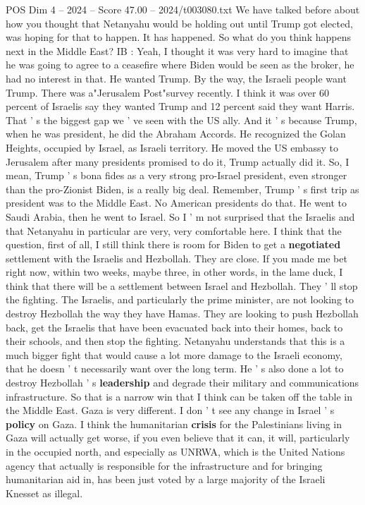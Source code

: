 \begin{textsample}{POS Dim 4 – 2024 – Score 47.00 – 2024/t003080.txt}
We have talked before about how you thought that Netanyahu would be holding out until Trump got elected, was hoping for that to happen.
It has happened.
So what do you think happens next in the Middle East?
IB : Yeah, I thought it was very hard to imagine that he was going to agree to a ceasefire where Biden would be seen as the broker, he had no interest in that.
He wanted Trump.
By the way, the Israeli people want Trump.
There was a"Jerusalem Post"survey recently.
I think it was over 60 percent of Israelis say they wanted Trump and 12 percent said they want Harris.
That ' s the biggest gap we ' ve seen with the US ally.
And it ' s because Trump, when he was president, he did the Abraham Accords.
He recognized the Golan Heights, occupied by Israel, as Israeli territory.
He moved the US embassy to Jerusalem after many presidents promised to do it, Trump actually did it.
So, I mean, Trump ' s bona fides as a very strong pro-Israel president, even stronger than the pro-Zionist Biden, is a really big deal.
Remember, Trump ' s first trip as president was to the Middle East.
No American presidents do that.
He went to Saudi Arabia, then he went to Israel.
So I ' m not surprised that the Israelis and that Netanyahu in particular are very, very comfortable here.
I think that the question, first of all, I still think there is room for Biden to get a \textbf{negotiated} settlement with the Israelis and Hezbollah.
They are close.
If you made me bet right now, within two weeks, maybe three, in other words, in the lame duck, I think that there will be a settlement between Israel and Hezbollah.
They ' ll stop the fighting.
The Israelis, and particularly the prime minister, are not looking to destroy Hezbollah the way they have Hamas.
They are looking to push Hezbollah back, get the Israelis that have been evacuated back into their homes, back to their schools, and then stop the fighting.
Netanyahu understands that this is a much bigger fight that would cause a lot more damage to the Israeli economy, that he doesn ' t necessarily want over the long term.
He ' s also done a lot to destroy Hezbollah ' s \textbf{leadership} and degrade their military and communications infrastructure.
So that is a narrow win that I think can be taken off the table in the Middle East.
Gaza is very different.
I don ' t see any change in Israel ' s \textbf{policy} on Gaza.
I think the humanitarian \textbf{crisis} for the Palestinians living in Gaza will actually get worse, if you even believe that it can, it will, particularly in the occupied north, and especially as UNRWA, which is the United Nations agency that actually is responsible for the infrastructure and for bringing humanitarian aid in, has been just voted by a large majority of the Israeli Knesset as illegal.

\end{textsample}
